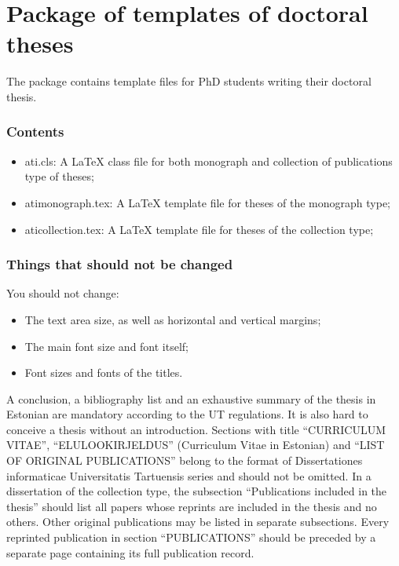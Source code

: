 \section{Package of templates of doctoral theses}

The package contains template files for PhD students writing their doctoral thesis.
	
\subsubsection{Contents}

\begin{itemize}
\item ati.cls: A LaTeX class file for both monograph and collection of publications type of theses;
\item atimonograph.tex: A LaTeX template file for theses of the monograph type;
\item aticollection.tex: A LaTeX template file for theses of the collection type;
\end{itemize}

\subsubsection{Things that should not be changed}

You should not change:
\begin{itemize}
\item The text area size, as well as horizontal and vertical margins;
\item The main font size and font itself;
\item Font sizes and fonts of the titles.
\end{itemize}

A conclusion, a bibliography list and an exhaustive summary of the thesis in Estonian are mandatory according to the UT regulations. It is also hard to conceive a thesis without an introduction. Sections with title “CURRICULUM VITAE”, “ELULOOKIRJELDUS” (Curriculum Vitae in Estonian) and “LIST OF ORIGINAL PUBLICATIONS” belong to the format of Dissertationes informaticae Universitatis Tartuensis series and should not be omitted. In a dissertation of the collection type, the subsection “Publications included in the thesis” should list all papers whose reprints are included in the thesis and no others. Other original publications may be listed in separate subsections. Every reprinted publication in section “PUBLICATIONS” should be preceded by a separate page containing its full publication record.


